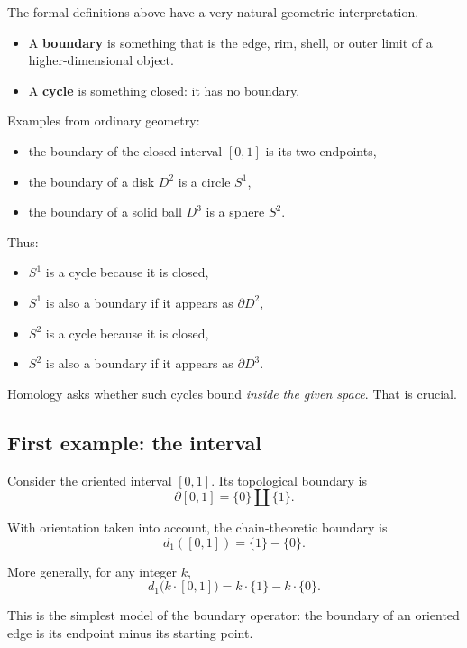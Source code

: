 \documentclass[12pt,a4paper]{article}
\theoremstyle{notespace}
\begin{document}
The formal definitions above have a very natural geometric interpretation.

\begin{itemize}
	\item A \textbf{boundary} is something that is the edge, rim, shell, or outer limit of a higher-dimensional object.
	\item A \textbf{cycle} is something closed: it has no boundary.
\end{itemize}

Examples from ordinary geometry:

\begin{itemize}
	\item the boundary of the closed interval \([0,1]\) is its two endpoints,
	\item the boundary of a disk \(D^2\) is a circle \(S^1\),
	\item the boundary of a solid ball \(D^3\) is a sphere \(S^2\).
\end{itemize}

Thus:

\begin{itemize}
	\item \(S^1\) is a cycle because it is closed,
	\item \(S^1\) is also a boundary if it appears as \(\partial D^2\),
	\item \(S^2\) is a cycle because it is closed,
	\item \(S^2\) is also a boundary if it appears as \(\partial D^3\).
\end{itemize}

Homology asks whether such cycles bound \emph{inside the given space}. That is crucial.

\subsection{ First example: the interval}

Consider the oriented interval \([0,1]\). Its topological boundary is
\[
\partial [0,1]=\{0\}\amalg \{1\}.
\]

With orientation taken into account, the chain-theoretic boundary is
\[
d_1([0,1])=\{1\}-\{0\}.
\]

More generally, for any integer \(k\),
\[
d_1\bigl(k\cdot [0,1]\bigr)=k\cdot \{1\}-k\cdot \{0\}.
\]

This is the simplest model of the boundary operator: the boundary of an oriented edge is its endpoint minus its starting point.
\end{document}
